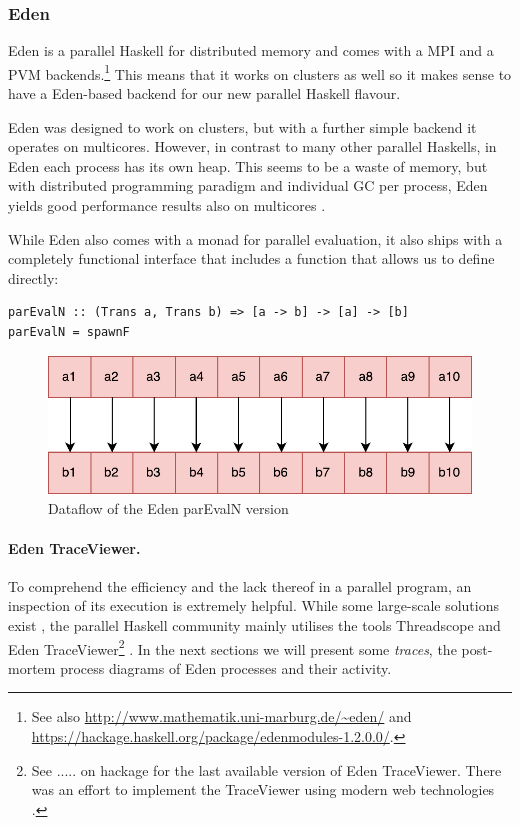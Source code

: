 \subsubsection{Eden}
Eden \cite{eden,Loogen2012} is a parallel Haskell for distributed memory and comes with a MPI and a PVM backends.\footnote{See also \url{http://www.mathematik.uni-marburg.de/~eden/} and \url{https://hackage.haskell.org/package/edenmodules-1.2.0.0/}.} This means that it works on clusters as well so it makes sense to have a Eden-based backend for our new parallel Haskell flavour.

Eden was designed to work on clusters, but with a further simple backend it operates on multicores. However, in contrast to many other parallel Haskells, in Eden each process has its own heap. This seems to be a waste of memory, but with distributed programming paradigm and individual GC per process, Eden yields good performance results also on multicores \cite{arcs-dc,aswad2009low}.

While Eden also comes with a monad  for parallel evaluation, it also ships with a completely functional interface that includes
a  function that
allows us to define  directly:

\begin{lstlisting}[frame=htrbl]
parEvalN :: (Trans a, Trans b) => [a -> b] -> [a] -> [b]
parEvalN = spawnF 
\end{lstlisting}
\begin{figure}[h]
	\includegraphics[scale=0.5]{images/parEvalNEden}
	\caption{Dataflow of the Eden parEvalN version}
\end{figure}

\paragraph{Eden TraceViewer.}
To comprehend the efficiency and the lack thereof in a parallel program, an inspection of its execution is extremely helpful. While some large-scale solutions exist \cite{Geimer2010}, the parallel Haskell community mainly utilises the tools Threadscope \cite{Wheeler2009} and Eden TraceViewer\footnote{See ..... on hackage for the last available version of Eden TraceViewer. There was an effort to implement the TraceViewer using modern web technologies \cite{traceviewer-web}.} \cite{Berthold2007a}. In the next sections we will present some \emph{traces}, the post-mortem process diagrams of Eden processes and their activity.

